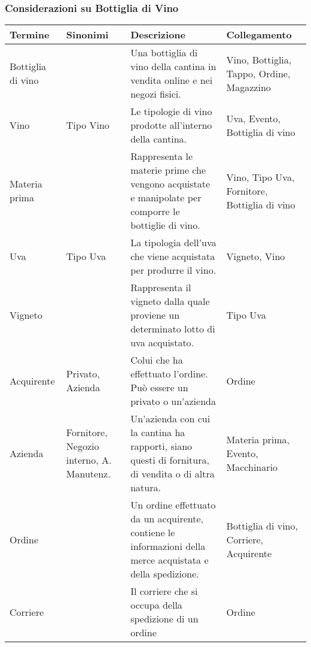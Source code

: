 \subsubsection{Considerazioni su Bottiglia di Vino}


\begin{center}
	\begin{longtable}{P{2cm}P{2cm}P{6cm}P{4cm}}
		\toprule
		 Termine & Sinonimi & Descrizione & Collegamento \\
		
		\midrule
		Bottiglia di vino & & Una bottiglia di vino della cantina in vendita online e nei negozi fisici. & Vino, Bottiglia, Tappo, Ordine, Magazzino\\
		\midrule
		Vino & Tipo Vino & Le tipologie di vino prodotte all'interno della cantina. & Uva, Evento, Bottiglia di vino \\
		
		\midrule
		Materia prima & & Rappresenta le materie prime che vengono acquistate e manipolate per comporre le bottiglie di vino. &  Vino, Tipo Uva, Fornitore, Bottiglia di vino\\
		
		\midrule
		Uva & Tipo Uva & La tipologia dell'uva che viene acquistata per produrre il vino. &  Vigneto, Vino\\
		
		\midrule
		Vigneto & & Rappresenta il vigneto dalla quale proviene un determinato lotto di uva acquistato. &  Tipo Uva\\

		\midrule
		Acquirente & Privato, Azienda & Colui che ha effettuato l'ordine. Può essere un privato o un'azienda &  Ordine\\

		\midrule
		Azienda & Fornitore, Negozio interno, A. Manutenz. & Un'azienda con cui la cantina ha rapporti, siano questi di fornitura, di vendita o di altra natura. &  Materia prima, Evento, Macchinario\\

		\midrule
		Ordine & & Un ordine effettuato da un acquirente, contiene le informazioni della merce acquistata e della spedizione. &  Bottiglia di vino, Corriere, Acquirente\\
		
		\midrule
		Corriere & & Il corriere che si occupa della spedizione di un ordine & Ordine\\
		\midrule
		

\end{longtable}
\end{center}
